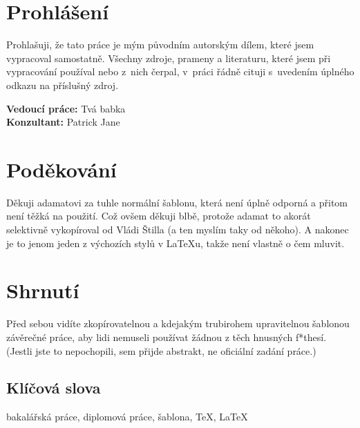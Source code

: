 \section*{Prohlášení} Prohlašuji, že tato práce je mým původním autorským dílem,
které jsem vypracoval samostatně. Všechny zdroje, prameny a literaturu, které
jsem při vypracování používal nebo z~nich čerpal, v~práci řádně cituji
s~uvedením úplného odkazu na příslušný zdroj.

\vfill\noindent
\textbf{Vedoucí práce:} Tvá babka   %
\\\textbf{Konzultant:} Patrick Jane %
\cleardoublepage

\section*{Poděkování} %
Děkuji adamatovi za tuhle normální šablonu, která není úplně odporná a přitom
není těžká na použití. Což ovšem děkuji blbě, protože adamat to akorát
selektivně vykopíroval od Vládi Štilla (a ten myslím taky od někoho). A nakonec
je to jenom jeden z výchozích stylů v \LaTeX u, takže není vlastně o čem mluvit.
\cleardoublepage

\section*{Shrnutí} %
Před sebou vidíte zkopírovatelnou a kdejakým trubirohem upravitelnou šablonou
závěrečné práce, aby lidi nemuseli používat žádnou z těch hnusných f*thesí.
(Jestli jste to nepochopili, sem přijde abstrakt, ne oficiální zadání práce.)

\subsection*{Klíčová slova} %
bakalářská práce, diplomová práce, šablona, \TeX, \LaTeX
\cleardoublepage
